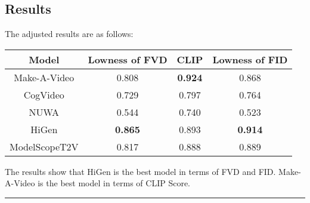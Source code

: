 \documentclass[12pt]{article}
\begin{document}
\subsection{Results}
The adjusted results are as follows:
\begin{center}
  \begin{tabular}{c c c c}
    \hline
    \textbf{Model} & \textbf{Lowness of FVD} & \textbf{CLIP} & \textbf{Lowness of FID}\\
    \hline
    Make-A-Video & 0.808 & \textbf{0.924} & 0.868\\
    CogVideo & 0.729 & 0.797 & 0.764\\
    NUWA & 0.544 & 0.740 & 0.523\\
    HiGen & \textbf{0.865} & 0.893 & \textbf{0.914}\\
    ModelScopeT2V & 0.817 & 0.888 & 0.889\\
    \hline
  \end{tabular}
\end{center}
The  results show that HiGen is the best model in terms of FVD and FID. Make-A-Video is the best model in terms of CLIP Score.\\
\hrule height 2pt \relax 
\end{document}
